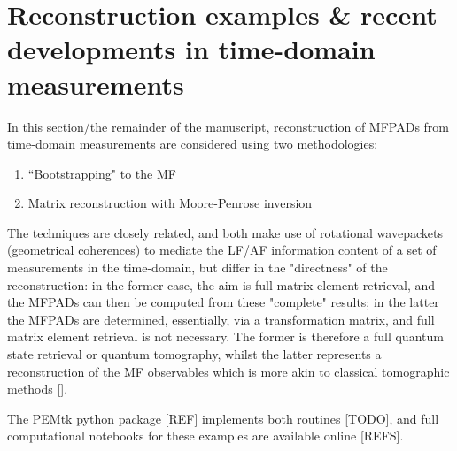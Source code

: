 \section{Reconstruction examples \& recent developments in time-domain measurements}

In this section/the remainder of the manuscript, reconstruction of MFPADs from time-domain measurements are considered using two methodologies:

\begin{enumerate}
\item ``Bootstrapping" to the MF \cite{hockett2018QMP1,hockett2018QMP2,marceau2017MolecularFrameReconstruction}
\item Matrix reconstruction with Moore-Penrose inversion \cite{gregory2021MolecularFramePhotoelectron}
\end{enumerate}

The techniques are closely related, and both make use of rotational wavepackets (geometrical coherences) to mediate the LF/AF information content of a set of measurements in the time-domain, but differ in the "directness" of the reconstruction: in the former case, the aim is full matrix element retrieval, and the MFPADs can then be computed from these "complete" results; in the latter the MFPADs are determined, essentially, via a transformation matrix, and full matrix element retrieval is not necessary. The former is therefore a full quantum state retrieval or quantum tomography, whilst the latter represents a reconstruction of the MF observables which is more akin to classical tomographic methods [].

The PEMtk python package [REF] implements both routines [TODO], and full computational notebooks for these examples are available online [REFS].